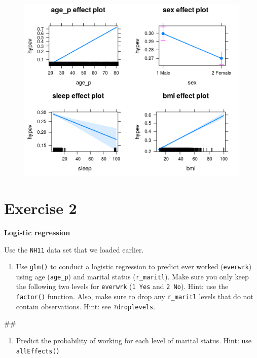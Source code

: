 \documentclass[]{book}
\newenvironment{Shaded}{\begin{snugshade}}{\end{snugshade}}
\newcommand{\NormalTok}[1]{#1}
\providecommand{\tightlist}{%
  \setlength{\itemsep}{0pt}\setlength{\parskip}{0pt}}
\begin{document}
\begin{figure}
\centering
\includegraphics{R/Rmodels/images/effects1.png}
\caption{}
\end{figure}

\section{Exercise 2}\label{exercise-2}

\textbf{Logistic regression}

Use the \texttt{NH11} data set that we loaded earlier.

\begin{enumerate}
\def\labelenumi{\arabic{enumi}.}
\tightlist
\item
  Use \texttt{glm()} to conduct a logistic regression to predict ever
  worked (\texttt{everwrk}) using age (\texttt{age\_p}) and marital
  status (\texttt{r\_maritl}). Make sure you only keep the following two
  levels for \texttt{everwrk} (\texttt{1\ Yes} and \texttt{2\ No}).
  Hint: use the \texttt{factor()} function. Also, make sure to drop any
  \texttt{r\_maritl} levels that do not contain observations. Hint: see
  \texttt{?droplevels}.
\end{enumerate}

\begin{Shaded}
\begin{Highlighting}[]
\NormalTok{## }
\end{Highlighting}
\end{Shaded}

\begin{enumerate}
\def\labelenumi{\arabic{enumi}.}
\setcounter{enumi}{1}
\tightlist
\item
  Predict the probability of working for each level of marital status.
  Hint: use \texttt{allEffects()}
\end{enumerate}
\end{document}
